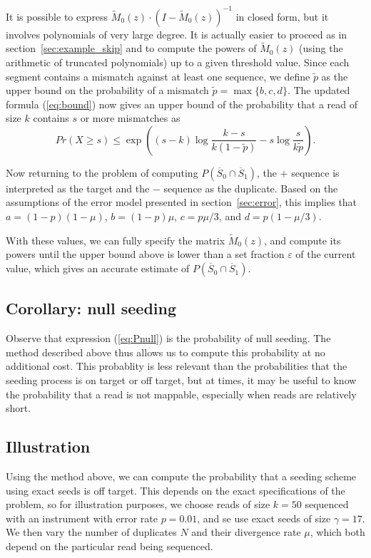 \documentclass{article}
\begin{document}
It is possible to express $\tilde{M}_0(z)\cdot(I-\tilde{M}_0(z))^{-1}$ in
closed form, but it involves polynomials of very large degree. It is
actually easier to proceed as in section~\ref{sec:example_skip} and to
compute the powers of $\tilde{M}_0(z)$ (using the arithmetic of truncated
polynomials) up to a given threshold value. Since each segment contains a
mismatch against at least one sequence, we define $\tilde{p}$ as the upper
bound on the probability of a mismatch $\tilde{p} = \max\{b,c,d\}$. The
updated formula (\ref{eq:bound}) now gives an upper bound of the
probability that a read of size $k$ contains $s$ or more mismatches as
\begin{equation*}
Pr(X \geq s) \leq \exp \left( (s-k)\log \frac{k-s}{k(1-\tilde{p})} -s\log
\frac{s}{k\tilde{p}} \right).
\end{equation*}

Now returning to the problem of computing $P(\overline{S}_0 \cap
\overline{S}_1)$, the $+$ sequence is interpreted as the target and the
$-$ sequence as the duplicate. Based on the assumptions of the error model
presented in section~\ref{sec:error}, this implies that $a =
(1-p)(1-\mu)$, $b = (1-p)\mu$, $c = p\mu/3$, and $d = p(1-\mu/3)$.

With these values, we can fully specify the matrix $\tilde{M}_0(z)$, and
compute its powers until the upper bound above is lower than a set
fraction $\varepsilon$ of the current value, which gives an accurate
estimate of $P(\overline{S}_0 \cap \overline{S}_1)$.


\subsection{Corollary: null seeding}

Observe that expression (\ref{eq:Pnull}) is the probability of null
seeding. The method described above thus allows us to compute this
probability at no additional cost. This probablity is less relevant than
the probabilities that the seeding process is on target or off target, but
at times, it may be useful to know the probability that a read is
not mappable, especially when reads are relatively short.


\subsection{Illustration}
\label{sec:illdual}

Using the method above, we can compute the probability that a seeding
scheme using exact seeds is off target. This depends on the exact
specifications of the problem, so for illustration purposes, we choose
reads of size $k=50$ sequenced with an instrument with error rate
$p=0.01$, and se use exact seeds of size $\gamma=17$. We then vary the
number of duplicates $N$ and their divergence rate $\mu$, which both
depend on the particular read being sequenced.
\end{document}
